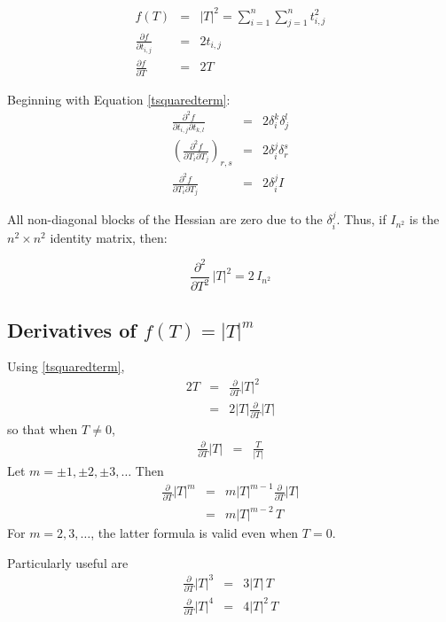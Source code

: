 \documentclass{report}
\begin{document}
\begin{eqnarray}
f(T) &=& |T|^2 = \sum_{i=1}^n \sum_{j=1}^n t_{i,j}^2 \\
\label{tsquaredterm}
\frac{\partial f}{\partial t_{i,j}} &=& 2 t_{i,j} \\
\frac{\partial f}{\partial T} &=& 2 T
\end{eqnarray}

\noindent Beginning with Equation \ref{tsquaredterm}:
\begin{eqnarray}
\frac{\partial^2 f}{\partial t_{i,j} \partial t_{k,l}} &=& 2 \delta_i^k \delta_j^l \\
\left(\frac{\partial^2 f}{\partial T_i \partial T_j}\right)_{r,s} &=& 2 \delta_i^j \delta_r^s \\
\frac{\partial^2 f}{\partial T_i \partial T_j} &=& 2 \delta_i^j I
\end{eqnarray}

\noindent All non-diagonal blocks of the Hessian are zero due to the $\delta_i^j$.  Thus, if $I_{n^2}$ is the $n^2 \times n^2$ identity matrix, then:

\begin{equation}
\frac{\partial^2}{\partial T^2} \, |T|^2 = 2 \, I_{n^2}
\end{equation}

\subsection{Derivatives of $f(T)=|T|^m$}
Using \ref{tsquaredterm},
\begin{eqnarray}
2 T & = & \frac{\partial}{\partial T} |T|^2 \nonumber \\
 & = & 2 |T| \frac{\partial}{\partial T} |T| \nonumber
\end{eqnarray}
so that when $T \neq 0$,
\begin{eqnarray}
\frac{\partial}{\partial T} |T| & = & \frac{T}{|T|}
\end{eqnarray}
Let $m=\pm 1, \pm 2,\pm 3,\ldots$  Then
\begin{eqnarray}
\frac{\partial}{\partial T} |T|^m & = & m |T|^{m-1} \frac{\partial }{\partial T}|T| \\
 & = & m |T|^{m-2} \, T \label{firstdervoftm}
\end{eqnarray}
For $m=2,3,\ldots$, the latter formula is valid even when $T=0$. \newline

\noindent Particularly useful are
\begin{eqnarray}
\frac{\partial}{\partial T} |T|^3 & = & 3 |T| \, T \\
\frac{\partial}{\partial T} |T|^4 & = & 4 |T|^2 \, T 
\end{eqnarray}
\end{document}
